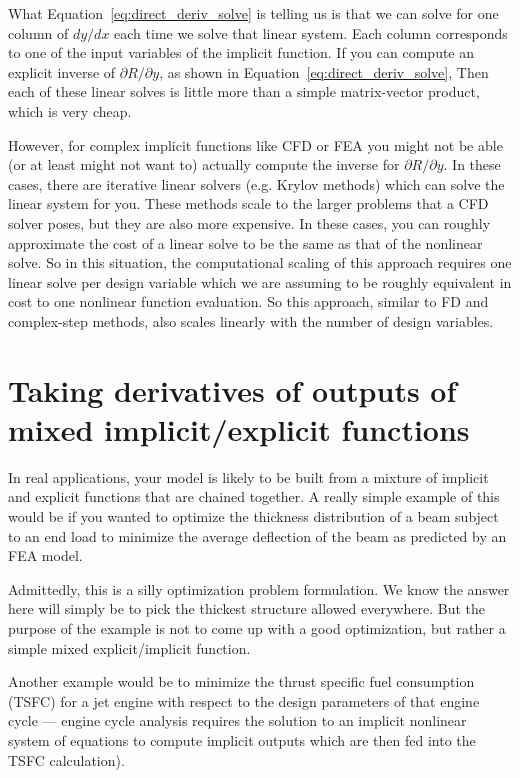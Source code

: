 \documentclass[conf]{new-aiaa}
\begin{document}
    What Equation~\eqref{eq:direct_deriv_solve} is telling us is that we can solve for one column of $dy/dx$ each time we solve that linear system. 
    Each column corresponds to one of the input variables of the implicit function. 
    If you can compute an explicit inverse of $\partial R/\partial y$, as shown in Equation~\eqref{eq:direct_deriv_solve},
    Then each of these linear solves is little more than a simple matrix-vector product, which is very cheap. 
    
    However, for complex implicit functions like CFD or FEA you might not be able (or at least might not want to) actually compute the inverse for $\partial R/\partial y$. 
    In these cases, there are iterative linear solvers (e.g. Krylov methods) which can solve the linear system for you. 
    These methods scale to the larger problems that a CFD solver poses, but they are also more expensive. 
    In these cases, you can roughly approximate the cost of a linear solve to be the same as that of the nonlinear solve. 
    So in this situation, the computational scaling of this approach requires one linear solve per design variable which we are assuming to be roughly equivalent in cost to one nonlinear function evaluation. 
    So this approach, similar to FD and complex-step methods, also scales linearly with the number of design variables. 



    \section{Taking derivatives of outputs of mixed implicit/explicit functions}

    In real applications, your model is likely to be built from a mixture of implicit and explicit functions that are chained together.
    A really simple example of this would be if you wanted to optimize the thickness distribution of a beam subject to an end load to minimize the average deflection of the beam as predicted by an FEA model. 
    
    Admittedly, this is a silly optimization problem formulation. 
    We know the answer here will simply be to pick the thickest structure allowed everywhere. 
    But the purpose of the example is not to come up with a good optimization, but rather a simple mixed explicit/implicit function. 
    
    Another example would be to minimize the thrust specific fuel consumption (TSFC) for a jet engine with respect to the design parameters of that engine cycle --- engine cycle analysis requires the solution to an implicit nonlinear system of equations to compute implicit outputs which are then fed into the TSFC calculation). 
\end{document}
